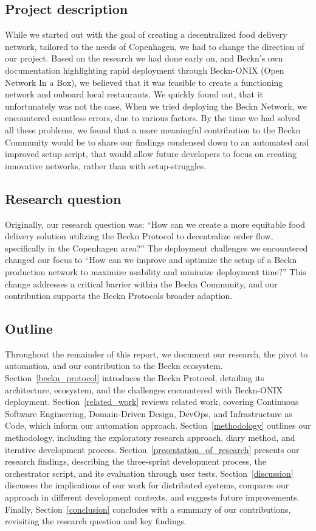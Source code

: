 \subsection{Project description}
\label{project_description}
While we started out with the goal of creating a decentralized food delivery network, tailored to the needs of Copenhagen, we had to change the direction of our project. Based on the research we had done early on, and Beckn's own documentation highlighting rapid deployment through Beckn-ONIX (Open Network In a Box), we believed that it was feasible to create a functioning network and onboard local restaurants. We quickly found out, that it unfortunately was not the case. When we tried deploying the Beckn Network, we encountered countless errors, due to various factors. By the time we had solved all these problems, we found that a more meaningful contribution to the Beckn Community would be to share our findings condensed down to an automated and improved setup script, that would allow future developers to focus on creating innovative networks, rather than with setup-struggles. 
\subsection{Research question}
\label{research_question}
Originally, our research question was: “How can we create a more equitable food delivery solution utilizing the Beckn Protocol to decentralize order flow, specifically in the Copenhagen area?” The deployment challenges we encountered changed our focus to “How can we improve and optimize the setup of a Beckn production network to maximize usability and minimize deployment time?” This change addresses a critical barrier within the Beckn Community, and our contribution supports the Beckn Protocols broader adaption.

\subsection{Outline}
\label{outline}
Throughout the remainder of this report, we document our research, the pivot to automation, and our contribution to the Beckn ecosystem. Section~\ref{beckn_protocol} introduces the Beckn Protocol, detailing its architecture, ecosystem, and the challenges encountered with Beckn-ONIX deployment. Section~\ref{related_work} reviews related work, covering Continuous Software Engineering, Domain-Driven Design, DevOps, and Infrastructure as Code, which inform our automation approach. Section~\ref{methodology} outlines our methodology, including the exploratory research approach, diary method, and iterative development process. Section~\ref{presentation_of_research} presents our research findings, describing the three-sprint development process, the orchestrator script, and its evaluation through user tests. Section~\ref{discussion} discusses the implications of our work for distributed systems, compares our approach in different development contexts, and suggests future improvements. Finally, Section~\ref{conclusion} concludes with a summary of our contributions, revisiting the research question and key findings.